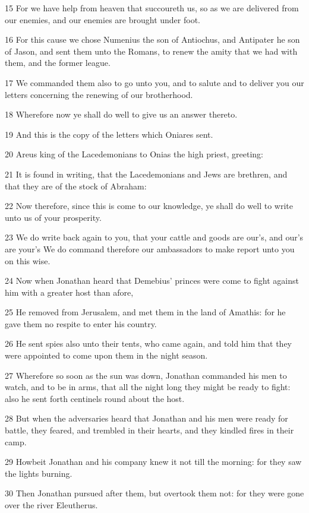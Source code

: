 \par 15 For we have help from heaven that succoureth us, so as we are delivered from our enemies, and our enemies are brought under foot.
\par 16 For this cause we chose Numenius the son of Antiochus, and Antipater he son of Jason, and sent them unto the Romans, to renew the amity that we had with them, and the former league.
\par 17 We commanded them also to go unto you, and to salute and to deliver you our letters concerning the renewing of our brotherhood.
\par 18 Wherefore now ye shall do well to give us an answer thereto.
\par 19 And this is the copy of the letters which Oniares sent.
\par 20 Areus king of the Lacedemonians to Onias the high priest, greeting:
\par 21 It is found in writing, that the Lacedemonians and Jews are brethren, and that they are of the stock of Abraham:
\par 22 Now therefore, since this is come to our knowledge, ye shall do well to write unto us of your prosperity.
\par 23 We do write back again to you, that your cattle and goods are our's, and our's are your's We do command therefore our ambassadors to make report unto you on this wise.
\par 24 Now when Jonathan heard that Demebius' princes were come to fight against him with a greater host than afore,
\par 25 He removed from Jerusalem, and met them in the land of Amathis: for he gave them no respite to enter his country.
\par 26 He sent spies also unto their tents, who came again, and told him that they were appointed to come upon them in the night season.
\par 27 Wherefore so soon as the sun was down, Jonathan commanded his men to watch, and to be in arms, that all the night long they might be ready to fight: also he sent forth centinels round about the host.
\par 28 But when the adversaries heard that Jonathan and his men were ready for battle, they feared, and trembled in their hearts, and they kindled fires in their camp.
\par 29 Howbeit Jonathan and his company knew it not till the morning: for they saw the lights burning.
\par 30 Then Jonathan pursued after them, but overtook them not: for they were gone over the river Eleutherus.
